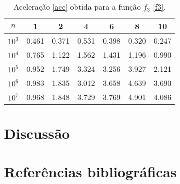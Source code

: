 \documentclass{article}
\begin{document}
        \begin{table}[h!]
          \centering
          \begin{tabular}{||c c c c c c c||}
            \hline
            $n$ & 1 & 2 & 4 & 6 & 8 & 10 \\ 
            \hline \hline
            $10^{3}$ & 0.461 & 0.371 & 0.531 & 0.398 & 0.320 & 0.247 \\ 
            \hline 
            $10^{4}$ & 0.765 & 1.122 & 1.562 & 1.431 & 1.196 & 0.990 \\ 
            \hline 
            $10^{5}$ & 0.952 & 1.749 & 3.324 & 3.256 & 3.927 & 2.121 \\ 
            \hline 
            $10^{6}$ & 0.983 & 1.835 & 3.012 & 3.658 & 4.639 & 3.690 \\ 
            \hline 
            $10^{7}$ & 0.968 & 1.848 & 3.729 & 3.769 & 4.901 & 4.086 \\ 
            \hline 
          \end{tabular}
          \caption{Aceleração \eqref{acc} obtida para a função $f_3$ \eqref{f3}. }
          \label{f3a}
        \end{table}

          

    

  \section{Discussão} \label{disc}

  \section{Referências bibliográficas} \label{bibl}

  \printbibliography[heading=none]
\end{document}
